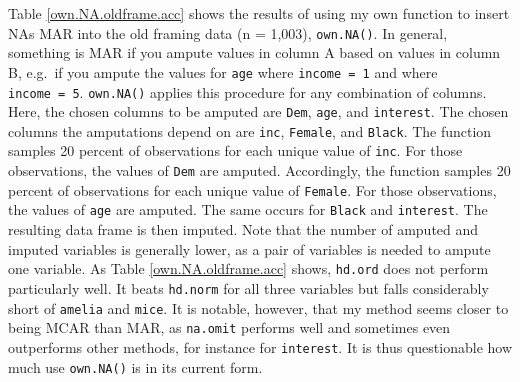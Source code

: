 \documentclass[12pt,econ]{sources/authesis}
\begin{document}
Table \ref{own.NA.oldframe.acc} shows the results of using my own function to insert NAs MAR into the old framing data (n = 1,003), \texttt{own.NA()}. In general, something is MAR if you ampute values in column A based on values in column B, e.g.~if you ampute the values for \texttt{age} where \texttt{income\ =\ 1} and where \texttt{income\ =\ 5}. \texttt{own.NA()} applies this procedure for any combination of columns. Here, the chosen columns to be amputed are \texttt{Dem}, \texttt{age}, and \texttt{interest}. The chosen columns the amputations depend on are \texttt{inc}, \texttt{Female}, and \texttt{Black}. The function samples 20 percent of observations for each unique value of \texttt{inc}. For those observations, the values of \texttt{Dem} are amputed. Accordingly, the function samples 20 percent of observations for each unique value of \texttt{Female}. For those observations, the values of \texttt{age} are amputed. The same occurs for \texttt{Black} and \texttt{interest}. The resulting data frame is then imputed. Note that the number of amputed and imputed variables is generally lower, as a pair of variables is needed to ampute one variable. As Table \ref{own.NA.oldframe.acc} shows, \texttt{hd.ord} does not perform particularly well. It beats \texttt{hd.norm} for all three variables but falls considerably short of \texttt{amelia} and \texttt{mice}. It is notable, however, that my method seems closer to being MCAR than MAR, as \texttt{na.omit} performs well and sometimes even outperforms other methods, for instance for \texttt{interest}. It is thus questionable how much use \texttt{own.NA()} is in its current form.
\end{document}
